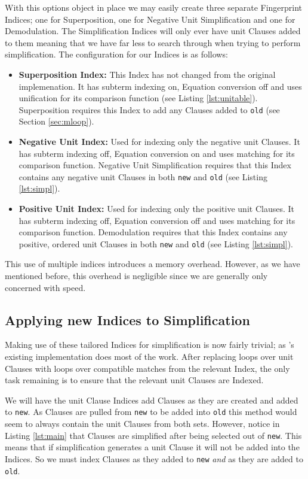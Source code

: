 With this options object in place we may easily create three separate
Fingerprint Indices; one for Superposition, one for Negative Unit Simplification and
one for Demodulation. The Simplification Indices will only ever have unit Clauses
added to them meaning that we have far less to search through when trying to perform
simplification. The configuration for our Indices is as follows:
\begin{itemize}
\item \textbf{Superposition Index:} This Index has not changed from the original
implemenation. It has subterm indexing on, Equation conversion off and uses
unification for its comparison function (see Listing \ref{lst:unitable}).
Superposition requires this Index to add any Clauses added to \verb!old!
(see Section \ref{sec:mloop}).
\item \textbf{Negative Unit Index:} Used for indexing only the negative
unit Clauses. It has subterm indexing off, Equation conversion on and uses
matching for its comparison function. Negative Unit Simplification requires
that this Index contains any negative unit Clauses in both \verb!new! and \verb!old!
(see Listing \ref{lst:simpl}).
\item \textbf{Positive Unit Index:} Used for indexing only the positive
unit Clauses. It has subterm indexing off, Equation conversion off and uses
matching for its comparison function. Demodulation requires
that this Index contains any positive, ordered unit Clauses in both \verb!new! and \verb!old!
(see Listing \ref{lst:simpl}).
\end{itemize}

This use of multiple indices introduces a memory overhead. However, as we have mentioned
before, this overhead is negligible since we are generally only concerned
with speed.

\subsection{Applying new Indices to Simplification}

Making use of these tailored Indices for simplification is now fairly trivial;
as \beagle's existing implementation does most of the work. After replacing
loops over unit Clauses with loops over compatible matches from the relevant Index, the
only task remaining is to ensure that the relevant unit Clauses are Indexed.

We will have the unit Clause Indices add Clauses as they are created and added
to \verb!new!. As Clauses are pulled from \verb!new! to be added into \verb!old!
this method would seem to always contain the unit Clauses from both sets.
However, notice in Listing \ref{lst:main} that Clauses are simplified after being
selected out of \verb!new!. This means that if simplification generates a unit
Clause it will not be added into the Indices. So we must index Clauses as they
added to \verb!new! \emph{and} as they are added to \verb!old!.

